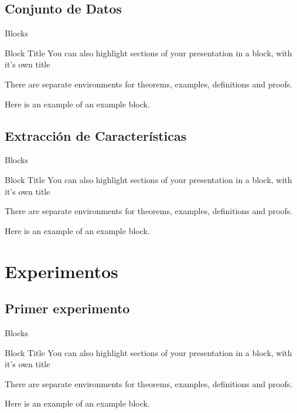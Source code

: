 \documentclass[aspectratio=169]{beamer}
\begin{document}
\subsection{Conjunto de Datos}

\begin{frame}{Blocks}
\begin{block}{Block Title}
You can also highlight sections of your presentation in a block, with it's own title
\end{block}
\begin{theorem}
There are separate environments for theorems, examples, definitions and proofs.
\end{theorem}
\begin{example}
Here is an example of an example block.
\end{example}
\end{frame}

\subsection{Extracción de Características}

\begin{frame}{Blocks}
\begin{block}{Block Title}
You can also highlight sections of your presentation in a block, with it's own title
\end{block}
\begin{theorem}
There are separate environments for theorems, examples, definitions and proofs.
\end{theorem}
\begin{example}
Here is an example of an example block.
\end{example}
\end{frame}

\section{Experimentos}

\subsection{Primer experimento}

\begin{frame}{Blocks}
\begin{block}{Block Title}
You can also highlight sections of your presentation in a block, with it's own title
\end{block}
\begin{theorem}
There are separate environments for theorems, examples, definitions and proofs.
\end{theorem}
\begin{example}
Here is an example of an example block.
\end{example}
\end{frame}
\end{document}
